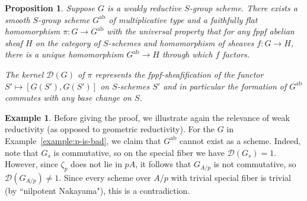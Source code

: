 \documentclass[11pt, letterpaper,english]{amsart}
\theoremstyle{plain}
\newtheorem{prop}[lem]{Proposition}
\theoremstyle{definition}
\newtheorem{example}[lem]{Example}
\numberwithin{equation}{section}
\numberwithin{lem}{section}
\newcommand{\sD}{{\mathscr D}}
\begin{document}
\begin{prop}\label{prop:abelianization}
Suppose $G$ is a weakly reductive $S$-group scheme.  
There exists a smooth $S$-group scheme $G^{\mathrm{ab}}$ of multiplicative type and a faithfully flat homomorphism $\pi: G \to G^{\mathrm{ab}}$ with the universal property that for any fppf abelian sheaf $H$ on the category of $S$-schemes and homomorphism of sheaves $f: G \to H$, there is a unique homomorphism $G^{\mathrm{ab}} \to H$ through which $f$ factors.

The kernel $\sD(G)$ of $\pi$ represents the fppf-sheafification of the functor $S' \mapsto [G(S'), G(S')]$ on $S$-schemes $S'$ and in particular the formation of $G^{\mathrm{ab}}$ commutes with any base change on $S$.
\end{prop}

\begin{example}\label{example:p-is-still-bad}
Before giving the proof, we illustrate again the relevance of weak reductivity (as opposed to geometric reductivity). For the $G$ in Example~\ref{example:p-is-bad}, we claim that $G^{\mathrm{ab}}$ cannot exist as a scheme. Indeed, note that $G_s$ is commutative, so on the special fiber we have $\sD(G_s) = 1$. However, since $\zeta_p$ does not lie in $pA$, it follows that $G_{A/p}$ is not commutative, so $\sD(G_{A/p}) \neq 1$. Since every scheme over $A/p$ with trivial special fiber is trivial (by ``nilpotent Nakayama"), this is a contradiction.
\end{example}
\end{document}
